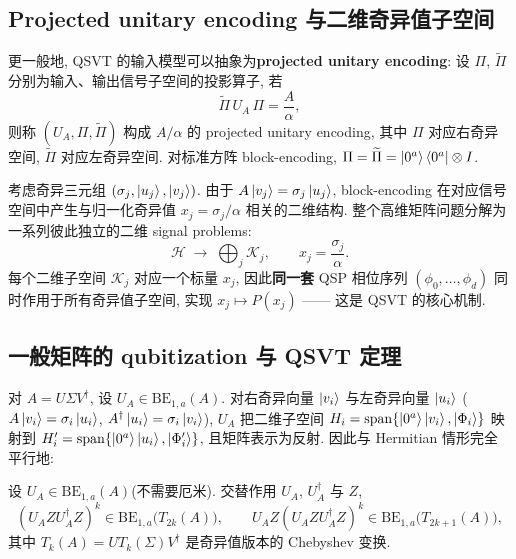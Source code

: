 \documentclass[utf8]{article} %
\numberwithin{equation}{section}   %
\newtheorem{Thm}{\hskip 2em {\color{blue} 定理}}[subsection]
\begin{document}
\subsection{Projected unitary encoding 与二维奇异值子空间}

更一般地, QSVT 的输入模型可以抽象为\textbf{projected unitary encoding}: 设 $\Pi$,
$\widetilde\Pi$ 分别为输入、输出信号子空间的投影算子, 若
\begin{equation}
    \widetilde\Pi\, U_A\, \Pi = \frac{A}{\alpha},
\end{equation}
则称 $(U_A, \Pi, \widetilde\Pi)$ 构成 $A/\alpha$ 的 projected unitary encoding, 其中
$\Pi$ 对应右奇异空间, $\widetilde\Pi$ 对应左奇异空间. 对标准方阵 block-encoding,
$\Pi = \widetilde\Pi = \ket{0^a}\bra{0^a}\otimes I$.

考虑奇异三元组 $(\sigma_j, \ket{u_j}, \ket{v_j})$. 由于 $A\ket{v_j} = \sigma_j\ket{u_j}$,
block-encoding 在对应信号空间中产生与归一化奇异值 $x_j = \sigma_j/\alpha$ 相关的二维结构.
整个高维矩阵问题分解为一系列彼此独立的二维 signal problems:
\begin{equation}
    \mathcal H \;\longrightarrow\; \bigoplus_j \mathcal K_j,
    \qquad
    x_j = \frac{\sigma_j}{\alpha}.
\end{equation}
每个二维子空间 $\mathcal K_j$ 对应一个标量 $x_j$, 因此\textbf{同一套} QSP 相位序列
$(\phi_0, \dots, \phi_d)$ 同时作用于所有奇异值子空间, 实现 $x_j \mapsto P(x_j)$ ——
这是 QSVT 的核心机制.

\subsection{一般矩阵的 qubitization 与 QSVT 定理}

对 $A = U\Sigma V^\dagger$, 设 $U_A \in \mathrm{BE}_{1,a}(A)$.
对右奇异向量 $\ket{v_i}$ 与左奇异向量 $\ket{u_i}$
($A\ket{v_i} = \sigma_i\ket{u_i}$, $A^\dagger\ket{u_i} = \sigma_i\ket{v_i}$),
$U_A$ 把二维子空间 $H_i = \mathrm{span}\{\ket{0^a}\ket{v_i}, \ket{\Phi_i}\}$ 映射到
$H'_i = \mathrm{span}\{\ket{0^a}\ket{u_i}, \ket{\Phi'_i}\}$, 且矩阵表示为反射.
因此与 Hermitian 情形完全平行地:

\begin{Thm}
    设 $U_A \in \mathrm{BE}_{1,a}(A)$(不需要厄米). 交替作用 $U_A$, $U_A^\dagger$ 与 $Z$,
    \begin{equation}
        (U_A Z U_A^\dagger Z)^k \in \mathrm{BE}_{1,a}\big(T_{2k}(A)\big), \qquad
        U_A Z (U_A Z U_A^\dagger Z)^k \in \mathrm{BE}_{1,a}\big(T_{2k+1}(A)\big),
    \end{equation}
    其中 $T_k(A) = U T_k(\Sigma) V^\dagger$ 是奇异值版本的 Chebyshev 变换.
\end{Thm}
\end{document}
